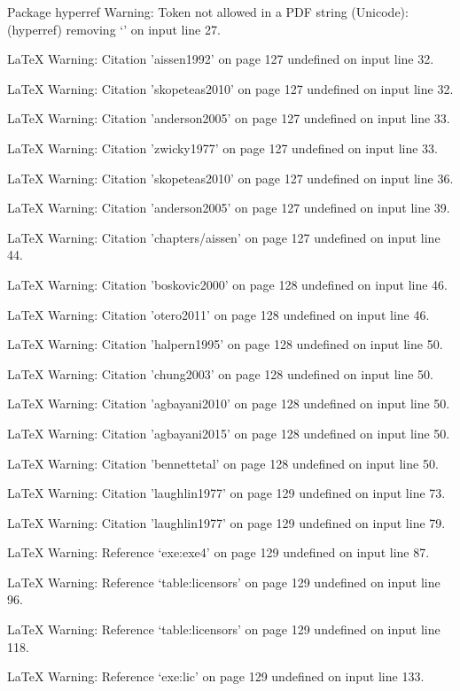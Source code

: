 Package hyperref Warning: Token not allowed in a PDF string (Unicode):
(hyperref)                removing `\newline' on input line 27.


LaTeX Warning: Citation 'aissen1992' on page 127 undefined on input line 32.


LaTeX Warning: Citation 'skopeteas2010' on page 127 undefined on input line 32.


LaTeX Warning: Citation 'anderson2005' on page 127 undefined on input line 33.


LaTeX Warning: Citation 'zwicky1977' on page 127 undefined on input line 33.


LaTeX Warning: Citation 'skopeteas2010' on page 127 undefined on input line 36.


LaTeX Warning: Citation 'anderson2005' on page 127 undefined on input line 39.


LaTeX Warning: Citation 'chapters/aissen' on page 127 undefined on input line 44.


LaTeX Warning: Citation 'boskovic2000' on page 128 undefined on input line 46.


LaTeX Warning: Citation 'otero2011' on page 128 undefined on input line 46.


LaTeX Warning: Citation 'halpern1995' on page 128 undefined on input line 50.


LaTeX Warning: Citation 'chung2003' on page 128 undefined on input line 50.


LaTeX Warning: Citation 'agbayani2010' on page 128 undefined on input line 50.


LaTeX Warning: Citation 'agbayani2015' on page 128 undefined on input line 50.


LaTeX Warning: Citation 'bennettetal' on page 128 undefined on input line 50.


LaTeX Warning: Citation 'laughlin1977' on page 129 undefined on input line 73.


LaTeX Warning: Citation 'laughlin1977' on page 129 undefined on input line 79.


LaTeX Warning: Reference `exe:exe4' on page 129 undefined on input line 87.


LaTeX Warning: Reference `table:licensors' on page 129 undefined on input line 96.


LaTeX Warning: Reference `table:licensors' on page 129 undefined on input line 118.


LaTeX Warning: Reference `exe:lic' on page 129 undefined on input line 133.


